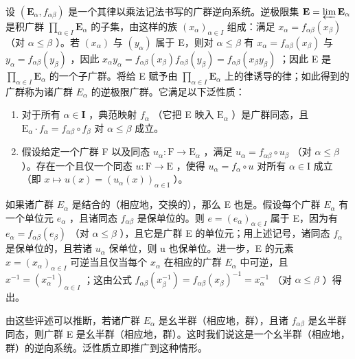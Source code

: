 设 \((\mathbf{E}_{\alpha}, f_{\alpha \beta})\) 是一个其律以乘法记法书写的广群逆向系统。逆极限集 \(\mathbf{E} = \varprojlim \mathbf{E}_{\alpha}\) 是积广群 \(\prod_{\alpha \in I} \mathbf{E}_{\alpha}\) 的子集，由这样的族 \((x_{\alpha})_{\alpha \in I}\) 组成：满足 \(x_{\alpha} = f_{\alpha \beta}(x_{\beta})\) （对 \(\alpha \leqslant \beta\) ）。若 \((x_{\alpha})\) 与 \((y_{\alpha})\) 属于 E，则对 \(\alpha \leqslant \beta\) 有 \(x_{\alpha} = f_{\alpha \beta}(x_{\beta})\) 与 \(y_{\alpha} = f_{\alpha \beta}(y_{\beta})\) ，因此 \(x_{\alpha}y_{\alpha} = f_{\alpha \beta}(x_{\beta})f_{\alpha \beta}(y_{\beta}) = f_{\alpha \beta}(x_{\beta}y_{\beta})\) ；因此 E 是 \(\prod_{\alpha \in I} \mathbf{E}_{\alpha}\) 的一个子广群。将给 E 赋予由 \(\prod_{\alpha \in I} \mathbf{E}_{\alpha}\) 上的律诱导的律；如此得到的广群称为诸广群 \(E_{\alpha}\) 的逆极限广群。它满足以下泛性质：

\begin{enumerate}
\def\labelenumi{(\alph{enumi})}
\item
  对于所有 \(\alpha \in \mathbf{I}\) ，典范映射 \(f_{\alpha}\) （它把 E 映入 \(\mathrm{E}_{\alpha}\) ）是广群同态，且 \(\mathrm{E}_{\alpha} \cdot f_{\alpha} = f_{\alpha \beta} \circ f_{\beta}\) 对 \(\alpha \leqslant \beta\) 成立。
\item
  假设给定一个广群 F 以及同态 \(u_{\alpha} \colon \mathrm{F} \to \mathrm{E}_{\alpha}\) ，满足 \(u_{\alpha} = f_{\alpha \beta} \circ u_{\beta}\) （对 \(\alpha \leqslant \beta\) ）。存在一个且仅一个同态 \(u \colon \mathrm{F} \to \mathrm{E}\) ，使得 \(u_{\alpha} = f_{\alpha} \circ u\) 对所有 \(\alpha \in \mathrm{I}\) 成立（即 \(x \mapsto u(x) = (u_{\alpha}(x))_{\alpha \in \mathrm{I}}\) ）。
\end{enumerate}

如果诸广群 \(E_{\alpha}\) 是结合的（相应地，交换的），那么 E 也是。假设每个广群 \(E_{\alpha}\) 有一个单位元 \(e_{\alpha}\) ，且诸同态 \(f_{\alpha\beta}\) 是保单位的。则 \(e = (e_{\alpha})_{\alpha \in I}\) 属于 E，因为有 \(e_{\alpha} = f_{\alpha\beta}(e_{\beta})\) （对 \(\alpha \leqslant \beta\) ），且它是广群 E 的单位元；用上述记号，诸同态 \(f_{\alpha}\) 是保单位的，且若诸 \(u_{\alpha}\) 保单位，则 u 也保单位。进一步，E 的元素 \(x = (x_{\alpha})_{\alpha \in I}\) 可逆当且仅当每个 \(x_{\alpha}\) 在相应的广群 \(E_{\alpha}\) 中可逆，且 \(x^{-1} = (x_{\alpha}^{-1})_{\alpha \in I}\) ；这由公式 \(f_{\alpha\beta}(x_{\beta}^{-1}) = f_{\alpha\beta}(x_{\beta})^{-1} = x_{\alpha}^{-1}\) （对 \(\alpha \leqslant \beta\) ）得出。

由这些评述可以推断，若诸广群 \(E_{\alpha}\) 是幺半群（相应地，群），且诸 \(f_{\alpha\beta}\) 是幺半群同态，则广群 E 是幺半群（相应地，群）。这时我们说这是一个幺半群（相应地，群）的逆向系统。泛性质立即推广到这种情形。

